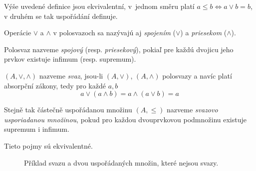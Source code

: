 Výše uvedené definice jsou ekvivalentní, v~jednom směru platí
$a \leq b \iff a \vee b = b$, v druhém se tak uspořádání definuje.

Operácie $\vee$ a $\wedge$ v polosvazoch sa nazývajú aj 
{\em spojením} ($\vee$) a {\em priesekom} ($\wedge$).

\begin{definition}
    Polosvaz nazveme {\em spojový} (resp. {\em priesekový}), 
	pokiaľ pre každú dvojicu jeho prvkov existuje infimum (resp. supremum).
\end{definition}

\begin{definition}[Svaz]
    $(A, \vee, \wedge)$ nazveme {\em svaz}, jsou-li
    $(A, \vee)$, $(A, \wedge)$ polosvazy a navíc platí absorpční zákony,
    tedy pro každé $a, b$
    \[ a \vee (a \wedge b) = a \wedge (a \vee b) = a \]

    Stejně tak částečně uspořádanou množinu $(A, \leq)$ nazveme
    {\em svazovo usporiadanou množinou}, pokud pro každou dvouprvkovou
	podmnožinu existuje supremum i infimum. 
\end{definition}

Tieto pojmy sú ekvivalentné.

\begin{figure}[h!]
\centering
{}
\hspace{10pt}
\hspace{10pt}
\caption{
Příklad svazu a dvou uspořádaných množin, které nejsou svazy.}
\end{figure}

